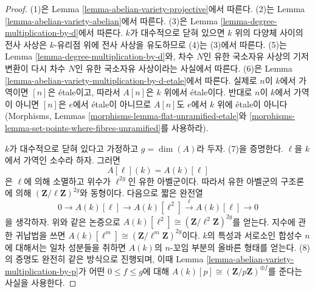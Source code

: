 \begin{proof}
(1)은 Lemma \ref{lemma-abelian-variety-projective}에서 따른다.
(2)는 Lemma \ref{lemma-abelian-variety-abelian}에서 따른다.
(3)은 Lemma \ref{lemma-degree-multiplication-by-d}에서 따른다.
$k$가 대수적으로 닫혀 있으면 $k$ 위의 다양체 사이의 전사 사상은 $k$-유리점 위에 전사 사상을 유도하므로
(4)는 (3)에서 따른다. (5)는 Lemma \ref{lemma-degree-multiplication-by-d}와, 차수 $N$인 유한 국소자유 사상의
기저변환이 다시 차수 $N$인 유한 국소자유 사상이라는 사실에서 따른다. (6)은 Lemma
\ref{lemma-abelian-variety-multiplication-by-d-etale}에서 따른다. 실제로 $n$이 $k$에서 가역이면 $[n]$은
\'etale이고, 따라서 $A[n]$은 $k$ 위에서 \'etale이다. 반대로 $n$이 $k$에서 가역이 아니면 $[n]$은
$e$에서 \'etale이 아니므로 $A[n]$도 $e$에서 $k$ 위에 \'etale이 아니다(Morphisms, Lemmas
\ref{morphisms-lemma-flat-unramified-etale}와
\ref{morphisms-lemma-set-points-where-fibres-unramified}를 사용하라).

\medskip\noindent
$k$가 대수적으로 닫혀 있다고 가정하고 $g = \dim(A)$라 두자. (7)을 증명한다. $\ell$을 $k$에서 가역인
소수라 하자. 그러면
$$
A[\ell](k) = A(k)[\ell]
$$
은 $\ell$에 의해 소멸하고 위수가 $\ell^{2g}$인 유한 아벨군이다. 따라서 유한 아벨군의 구조론에 의해
$(\mathbf{Z}/\ell\mathbf{Z})^{2g}$와 동형이다. 다음으로 짧은 완전열
$$
0 \to A(k)[\ell] \to A(k)[\ell^2] \xrightarrow{\ell} A(k)[\ell] \to 0
$$
을 생각하자. 위와 같은 논증으로
$A(k)[\ell^2] \cong (\mathbf{Z}/\ell^2\mathbf{Z})^{2g}$를 얻는다. 지수에 관한 귀납법을 쓰면
$A(k)[\ell^m] \cong (\mathbf{Z}/\ell^m\mathbf{Z})^{2g}$이다. $k$의 특성과 서로소인 합성수 $n$에 대해서는
일차 성분들을 취하면 $A(k)$의 $n$-꼬임 부분의 올바른 형태를 얻는다. (8)의 증명도 완전히 같은 방식으로 진행되며,
이때 Lemma \ref{lemma-abelian-variety-multiplication-by-p}가 어떤 $0 \leq f \leq g$에 대해
$A(k)[p] \cong (\mathbf{Z}/p\mathbf{Z})^{\oplus f}$를 준다는 사실을 사용한다.
\end{proof}

